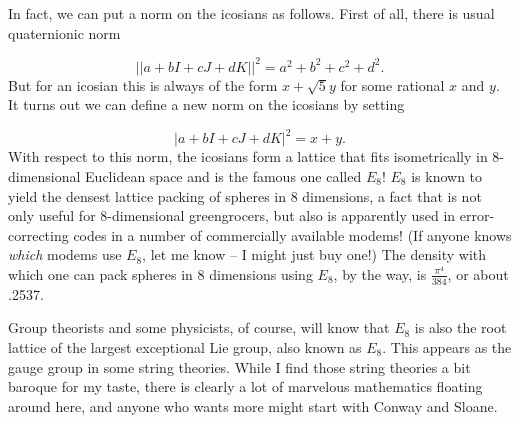 In fact, we can put a norm on the icosians as follows. First of all, there is usual quaternionic norm

\[          ||a + bI + cJ + dK||^2 = a^2 + b^2 + c^2 + d^2. \]
But for an icosian this is always of the form $x + \sqrt{5} y$ for some rational $x$ and $y$. It turns out we can define a new norm on the icosians by setting

\[          |a + bI + cJ + dK|^2 = x + y.\]
With respect to this norm, the icosians form a lattice that fits isometrically in 8-dimensional Euclidean space and is the famous one called $E_8$! $E_8$ is known to yield the densest lattice packing of spheres in 8 dimensions, a fact that is not only useful for 8-dimensional greengrocers, but also is apparently used in error-correcting codes in a number of commercially available modems! (If anyone knows \emph{which} modems use $E_8$, let me know -- I might just buy one!) The density with which one can pack spheres in 8 dimensions using $E_8$, by the way, is $\frac{\pi^4}{384}$, or about .2537.

Group theorists and some physicists, of course, will know that $E_8$ is also the root lattice of the largest exceptional Lie group, also known as $E_8$. This appears as the gauge group in some string theories. While I find those string theories a bit baroque for my taste, there is clearly a lot of marvelous mathematics floating around here, and anyone who wants more might start with Conway and Sloane.

\Addendum

